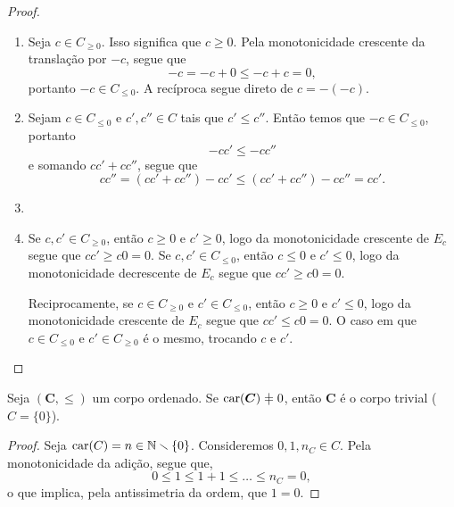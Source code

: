 \begin{proof}
	\begin{enumerate}

	\item Seja $c \in C_{\geq 0}$. Isso significa que $c \geq 0$. Pela monotonicidade crescente da translação por $-c$, segue que
		\begin{equation*}
		-c = -c+0 \leq -c+c = 0,
		\end{equation*}
portanto $-c \in C_{\leq 0}$. A recíproca segue direto de $c=-(-c)$.

	\item Sejam $c \in C_{\leq 0}$ e $c',c'' \in C$ tais que $c' \leq c''$. Então temos que $-c \in C_{\leq 0}$, portanto
	\begin{equation*}
	-cc' \leq -cc''
	\end{equation*}
e somando $cc'+cc''$, segue que
	\begin{equation*}
	cc'' = (cc'+cc'')-cc' \leq (cc'+cc'')-cc'' = cc'.
	\end{equation*}

	\item

	\item Se $c,c' \in C_{\geq 0}$, então $c \geq 0$ e $c' \geq 0$, logo da monotonicidade crescente de $E_c$ segue que $cc' \geq c0=0$. Se $c,c' \in C_{\leq 0}$, então $c \leq 0$ e $c' \leq 0$, logo da monotonicidade decrescente de $E_c$ segue que $cc' \geq c0=0$.

Reciprocamente, se $c \in C_{\geq 0}$ e $c' \in C_{\leq 0}$, então $c \geq 0$ e $c' \leq 0$, logo da monotonicidade crescente de $E_c$ segue que $cc' \leq c0=0$. O caso em que $c \in C_{\leq 0}$ e $c' \in C_{\geq 0}$ é o mesmo, trocando $c$ e $c'$.
	\end{enumerate}
\end{proof}

\begin{proposition}
Seja $(\bm C,\leq)$ um corpo ordenado. Se $\car(\bm C) \neq 0$, então $\bm C$ é o corpo trivial ($C=\{0\}$).
\end{proposition}
\begin{proof}
Seja $\operatorname{car}(C)=n \in \mathbb{N} \smallsetminus \{0\}$. Consideremos $0,1,n_C \in C$. Pela monotonicidade da adição, segue que,
	\begin{equation*}
	0 \leq 1 \leq 1+1 \leq \ldots \leq n_C=0,
	\end{equation*}
o que implica, pela antissimetria da ordem, que $1=0$.
\end{proof}

